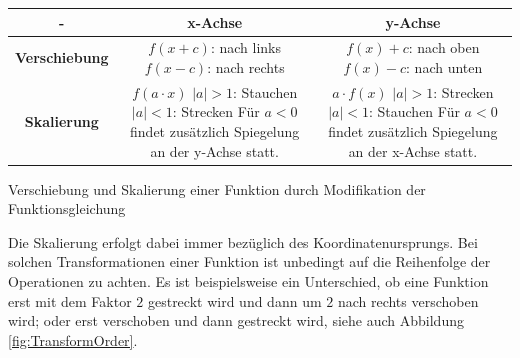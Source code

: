 \begin{listing}
    \begin{center}
        \begin{tabular}{ c | c | c }
            - & \textbf{x-Achse} & \textbf{y-Achse} \\
            \hline
            \textbf{Verschiebung} & \makecell{$f(x+c)$: nach links \\ $f(x-c)$: nach rechts} & \makecell{$f(x)+c$: nach oben \\ $f(x)-c$: nach unten} \\
            \hline
            \textbf{Skalierung} & \makecell{$f(a \cdot x)$ \\ $|a| > 1$: Stauchen \\ $|a| < 1$: Strecken \\ Für $a<0$ findet zusätzlich \\ Spiegelung an der y-Achse statt.} & \makecell{$a \cdot f(x)$ \\ $|a| > 1$: Strecken \\ $|a| < 1$: Stauchen \\ Für $a<0$ findet zusätzlich \\ Spiegelung an der x-Achse statt.}
        \end{tabular}
    \end{center}
    \caption{Verschiebung und Skalierung einer Funktion durch Modifikation der Funktionsgleichung}
    \label{lst:TranslateScaleFun}
\end{listing}

Die Skalierung erfolgt dabei immer bezüglich des Koordinatenursprungs. Bei solchen Transformationen einer Funktion ist unbedingt auf die Reihenfolge der Operationen zu achten. Es ist beispielsweise ein Unterschied, ob eine Funktion erst mit dem Faktor $2$ gestreckt wird und dann um $2$ nach rechts verschoben wird; oder erst verschoben und dann gestreckt wird, siehe auch Abbildung \ref{fig:TransformOrder}.

